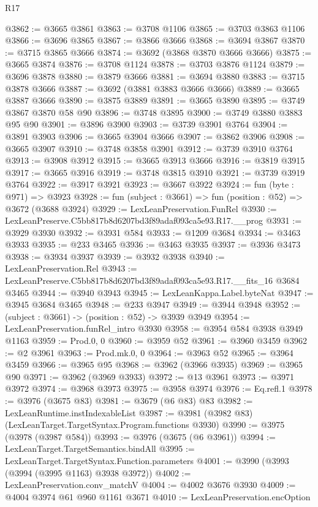 \begin{lexlean}{R17}
\begin{coremodule}
@3862 := @3665 @3861
@3863 := @3708 @1106
@3865 := @3703 @3863 @1106
@3866 := @3696 @3865
@3867 := @3866 @3666
@3868 := @3694 @3867
@3870 := @3715 @3865 @3666
@3874 := @3692 (@3868 @3870 @3666 @3666)
@3875 := @3665 @3874
@3876 := @3708 @1124
@3878 := @3703 @3876 @1124
@3879 := @3696 @3878
@3880 := @3879 @3666
@3881 := @3694 @3880
@3883 := @3715 @3878 @3666
@3887 := @3692 (@3881 @3883 @3666 @3666)
@3889 := @3665 @3887 @3666
@3890 := @3875 @3889
@3891 := @3665 @3890
@3895 := @3749 @3867 @3870 @58 @90
@3896 := @3748 @3895
@3900 := @3749 @3880 @3883 @95 @90
@3901 := @3896 @3900
@3903 := @3739 @3901 @3764
@3904 := @3891 @3903
@3906 := @3665 @3904 @3666
@3907 := @3862 @3906
@3908 := @3665 @3907
@3910 := @3748 @3858 @3901
@3912 := @3739 @3910 @3764
@3913 := @3908 @3912
@3915 := @3665 @3913 @3666
@3916 := @3819 @3915
@3917 := @3665 @3916
@3919 := @3748 @3815 @3910
@3921 := @3739 @3919 @3764
@3922 := @3917 @3921
@3923 := @3667 @3922
@3924 := fun (byte : @971) => @3923
@3928 := fun (subject : @3661) => fun (position : @52) => @3672 (@3688 @3924)
@3929 := LexLeanPreservation.FunRel
@3930 := LexLeanPreserve.C5bb817b8d6207bd3f89adaf093ca5e93.R17.__prog
@3931 := @3929 @3930
@3932 := @3931 @584
@3933 := @1209 @3684
@3934 := @3463 @3933
@3935 := @233 @3465
@3936 := @3463 @3935
@3937 := @3936 @3473
@3938 := @3934 @3937
@3939 := @3932 @3938
@3940 := LexLeanPreservation.Rel
@3943 := LexLeanPreserve.C5bb817b8d6207bd3f89adaf093ca5e93.R17.__fits_16 @3684 @3465
@3944 := @3940 @3943
@3945 := LexLeanKappa.Label.byteNat
@3947 := @3945 @3684 @3465
@3948 := @233 @3947
@3949 := @3944 @3948
@3952 := (subject : @3661) -> (position : @52) -> @3939 @3949
@3954 := LexLeanPreservation.funRel_intro @3930
@3958 := @3954 @584 @3938 @3949 @1163
@3959 := Prod.{0, 0}
@3960 := @3959 @52
@3961 := @3960 @3459
@3962 := @2 @3961
@3963 := Prod.mk.{0, 0}
@3964 := @3963 @52
@3965 := @3964 @3459
@3966 := @3965 @95
@3968 := @3962 (@3966 @3935)
@3969 := @3965 @90
@3971 := @3962 (@3969 @3933)
@3972 := @13 @3961
@3973 := @3971 @3972
@3974 := @3968 @3973
@3975 := @3958 @3974
@3976 := Eq.refl.{1}
@3978 := @3976 (@3675 @83)
@3981 := @3679 (@6 @83) @83
@3982 := LexLeanRuntime.instIndexableList
@3987 := @3981 (@3982 @83) (LexLeanTarget.TargetSyntax.Program.functions @3930)
@3990 := @3975 (@3978 (@3987 @584))
@3993 := @3976 (@3675 (@6 @3961))
@3994 := LexLeanTarget.TargetSemantics.bindAll
@3995 := LexLeanTarget.TargetSyntax.Function.parameters
@4001 := @3990 (@3993 (@3994 (@3995 @1163) @3938 @3972))
@4002 := LexLeanPreservation.conv_matchV
@4004 := @4002 @3676 @3930
@4009 := @4004 @3974 @61 @960 @1161 @3671
@4010 := LexLeanPreservation.encOption

\end{coremodule}
\end{lexlean}
